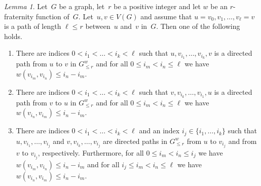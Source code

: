 \documentclass[1p,number,a4paper]{elsarticle}
\theoremstyle{remark}
\newtheorem{lemma}[theorem]{Lemma}
\begin{document}
\begin{lemma}\label{thm:augmentationneighborhood}
  Let~$G$ be a graph, let~$r$ be a positive integer and 
  let $w$ be an $r$-fraternity function of~$G$.  
  Let~$u,v\in V(G)$
  and assume that \mbox{$u=v_0, v_1,\ldots, v_\ell=v$} is a path of
  length $\ell\leq r$ between~$u$ and~$v$ in~$G$. Then 
  one of the following holds. 
  \begin{enumerate}
	\item There are indices $0< i_1<\ldots<i_k< \ell$ 
	such that $u,v_{i_1}, \ldots, v_{i_k},v$ is a directed 
	path from $u$ to $v$ in $G^w_{\leq r}$ and for all 
  $0\leq i_m<i_n\leq \ell$ we have $w(v_{i_m}, v_{i_n})\leq 
  i_n-i_m$.
    \item There are indices $0< i_1<\ldots<i_k< \ell$ 
	such that $v,v_{i_k}, \ldots, v_{i_1},u$ is a directed 
	path from $v$ to $u$ in $G^w_{\leq r}$ and for all 
  $0\leq i_m<i_n\leq \ell$ we have $w(v_{i_n}, v_{i_m})\leq 
  i_n-i_m$.
    \item There are indices $0< i_1<\ldots<i_k< \ell$ and 
    an index $i_j\in \{i_1,\ldots, i_k\}$ such that 
    $u, v_{i_1},\ldots, v_{i_j}$ and $v, v_{i_k},\ldots, v_{i_j}$
    are directed paths in $G^w_{\leq r}$ from $u$ to $v_{i_j}$ and from 
    $v$ to $v_{i_j}$, respectively. Furthermore, for all 
  $0\leq i_m<i_n\leq i_j$ we have $w(v_{i_m}, v_{i_n})\leq 
  i_n-i_m$ and for all 
  $i_j\leq i_m<i_n\leq \ell$ we have $w(v_{i_n}, v_{i_m})\leq 
  i_n-i_m$.
  \end{enumerate}
\end{lemma}
\end{document}
